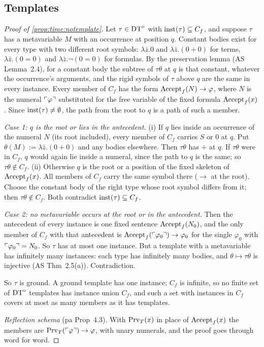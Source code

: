 \subsection{Templates}\label{app:time:templates}

\begin{proof}[Proof of \cref{prop:time:notemplate}]
Let $\tau\in\mathrm{DT}^{\circ}$ with $\mathrm{inst}(\tau)\subseteq C_f$, and suppose $\tau$ has a metavariable $M$ with an occurrence at position $q$. Constant bodies exist for every type with two different root symbols: $\lambda\bar z.0$ and $\lambda\bar z.(0+0)$ for terms, $\lambda\bar z.(0=0)$ and $\lambda\bar z.\neg(0=0)$ for formulas. By the preservation lemma (AS Lemma~2.4), for a constant body the subtree of $\tau\theta$ at $q$ is that constant, whatever the occurrence's arguments, and the rigid symbols of $\tau$ above $q$ are the same in every instance. Every member of $C_f$ has the form $\mathrm{Accept}_{f}(N)\to\varphi$, where $N$ is the numeral $\ulcorner \varphi\urcorner$ substituted for the free variable of the fixed formula $\mathrm{Accept}_{f}(x)$. Since $\mathrm{inst}(\tau)\ne\emptyset$, the path from the root to $q$ is a path of such a member.

\emph{Case 1: $q$ is the root or lies in the antecedent.}
(i) If $q$ lies inside an occurrence of the numeral $N$ (its root included), every member of $C_f$ carries $S$ or $0$ at $q$. Put $\theta(M):=\lambda\bar z.(0+0)$ and any bodies elsewhere. Then $\tau\theta$ has $+$ at $q$. If $\tau\theta$ were in $C_f$, $q$ would again lie inside a numeral, since the path to $q$ is the same; so $\tau\theta\notin C_f$.
(ii) Otherwise $q$ is the root or a position of the fixed skeleton of $\mathrm{Accept}_{f}(x)$. All members of $C_f$ carry the same symbol there ($\to$ at the root). Choose the constant body of the right type whose root symbol differs from it; then $\tau\theta\notin C_f$.
Both contradict $\mathrm{inst}(\tau)\subseteq C_f$.

\emph{Case 2: no metavariable occurs at the root or in the antecedent.} Then the antecedent of every instance is one fixed sentence $\mathrm{Accept}_{f}(N_0)$, and the only member of $C_f$ with that antecedent is $\mathrm{Accept}_{f}(\ulcorner \varphi_0\urcorner)\to\varphi_0$ for the single $\varphi_0$ with $\ulcorner \varphi_0\urcorner=N_0$. So $\tau$ has at most one instance. But a template with a metavariable has infinitely many instances: each type has infinitely many bodies, and $\theta\mapsto\tau\theta$ is injective (AS Thm~2.5(a)). Contradiction.

So $\tau$ is ground. A ground template has one instance; $C_f$ is infinite, so no finite set of $\mathrm{DT}^{\circ}$ templates has instance union $C_f$, and such a set with instances in $C_f$ covers at most as many members as it has templates.

\emph{Reflection schema} (pa Prop~4.3). With $\mathrm{Prv}_T(x)$ in place of $\mathrm{Accept}_{f}(x)$ the members are $\mathrm{Prv}_T(\ulcorner \varphi\urcorner)\to\varphi$, with unary numerals, and the proof goes through word for word.
\end{proof}


